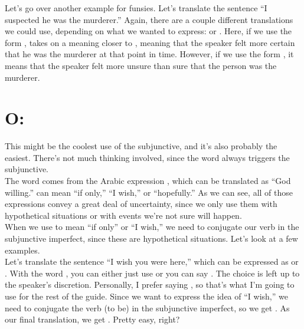 Let's go over another example for funsies. Let's translate the sentence ``I suspected he was the murderer.'' Again, there are a couple different translations we could use, depending on what we wanted to express:  or . Here, if we use the form ,  takes on a meaning closer to , meaning that the speaker felt more certain that he was the murderer at that point in time. However, if we use the form , it means that the speaker felt more unsure than sure that the person was the murderer. 
\section{O: }

This might be the coolest use of the subjunctive, and it's also probably the easiest. There's not much thinking involved, since the word  always triggers the subjunctive. \\

The word  comes from the Arabic expression , which can be translated as ``God willing.''  can mean ``if only,'' ``I wish,'' or ``hopefully.'' As we can see, all of those expressions convey a great deal of uncertainty, since we only use them with hypothetical situations or with events we're not sure will happen.\\

When we use  to mean ``if only'' or ``I wish,'' we need to conjugate our verb in the subjunctive imperfect, since these are hypothetical situations. Let's look at a few examples. \\

Let's translate the sentence ``I wish you were here,'' which can be expressed as  or . With the word , you can either just use  or you can say . The choice is left up to the speaker's discretion. Personally, I prefer saying , so that's what I'm going to use for the rest of the guide. Since we want to express the idea of ``I wish,'' we need to conjugate the verb  (to be) in the subjunctive imperfect, so we get . As our final translation, we get . Pretty easy, right? \\

